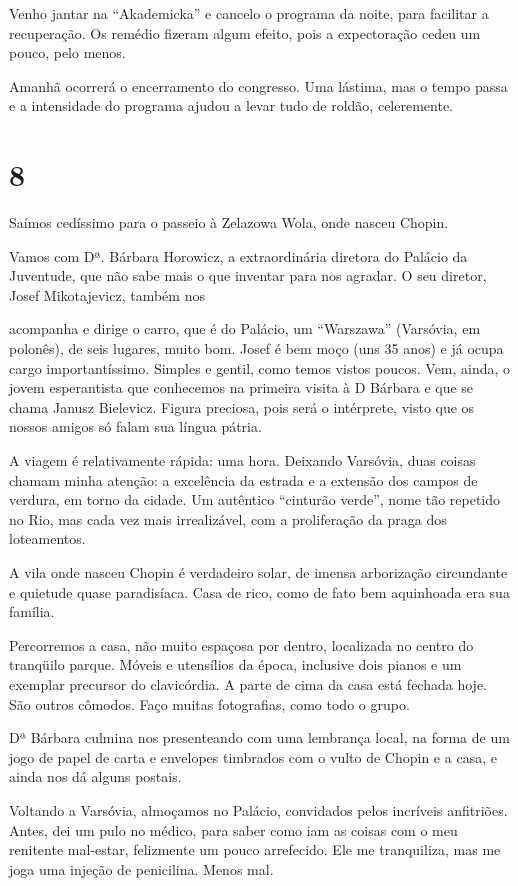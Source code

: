 Venho jantar na “Akademicka” e cancelo o programa da noite, para facilitar a recuperação. Os remédio fizeram algum efeito, pois a expectoração cedeu um pouco, pelo menos.

Amanhã ocorrerá o encerramento do congresso. Uma lástima, mas o tempo passa e a intensidade do programa ajudou a levar tudo de roldão, celeremente.

\section*{8 \adfflatleafright {}}
Saímos cedíssimo para o passeio à Zelazowa Wola, onde nasceu Chopin.

Vamos com Dª. Bárbara Horowicz, a extraordinária diretora do Palácio da Juventude, que não sabe mais o que inventar para nos agradar. O seu diretor, Josef Mikotajevicz, também nos

acompanha e dirige o carro, que é do Palácio, um “Warszawa” (Varsóvia, em polonês), de seis lugares, muito bom. Josef é bem moço (uns 35 anos) e já ocupa cargo importantíssimo. Simples e gentil, como temos vistos poucos. Vem, ainda, o jovem esperantista que conhecemos na primeira visita à D Bárbara e que se chama Janusz Bielevicz. Figura preciosa, pois será o intérprete, visto que os nossos amigos só falam sua língua pátria.

A viagem é relativamente rápida: uma hora. Deixando Varsóvia, duas coisas chamam minha atenção: a excelência da estrada e a extensão dos campos de verdura, em torno da cidade. Um autêntico “cinturão verde”, nome tão repetido no Rio, mas cada vez mais irrealizável, com a proliferação da praga dos loteamentos.

A vila onde nasceu Chopin é verdadeiro solar, de imensa arborização circundante e quietude quase paradisíaca. Casa de rico, como de fato bem aquinhoada era sua família.

Percorremos a casa, não muito espaçosa por dentro, localizada no centro do tranqüilo parque. Móveis e utensílios da época, inclusive dois pianos e um exemplar precursor do clavicórdia. A parte de cima da casa está fechada hoje. São outros cômodos. Faço muitas fotografias, como todo o grupo.

Dª Bárbara culmina nos presenteando com uma lembrança local, na forma de um jogo de papel de carta e envelopes timbrados com o vulto de Chopin e a casa, e ainda nos dá alguns postais.

Voltando a Varsóvia, almoçamos no Palácio, convidados pelos incríveis anfitriões. Antes, dei um pulo no médico, para saber como iam as coisas com o meu renitente mal-estar, felizmente um pouco arrefecido. Ele me tranquiliza, mas me joga uma injeção de penicilina. Menos mal.

